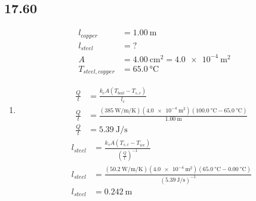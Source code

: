 \documentclass{article}
\begin{document}
\subsection{17.60}

\begin{align*}
	l_{copper} & = \SI{1.00}{\meter} \\
	l_{steel} & = ? \\
	A & = \SI{4.00}{\centi \meter \squared} = \SI{4.0e-4}{\meter \squared} \\
	T_{steel,copper} & = \SI{65.0}{\celsius}
\end{align*}
\begin{enumerate}[label = \boldalph]
	\item
		\begin{align*}
			\frac{ Q }{ t } & = \frac{ k_{c}A(T_{boil} - T_{s,c}) }{ l_{c} } \\
			\frac{ Q }{ t } & = \frac{ (\SI{385}{\watt \per \meter \per \kelvin})(\SI{4.0e-4}{\meter \squared})(\SI{100.0}{\celsius} - \SI{65.0}{\celsius}) }{ \SI{1.00}{\meter} } \\
			\frac{ Q }{ t } & = \SI{5.39}{\joule \per \second}
		\end{align*}
		\begin{align*}
			l_{steel} & = \frac{ k_{s}A(T_{s,c} - T_{ice}) }{ \left( \frac{ Q }{ t } \right)^{-1} } \\
			l_{steel} & = \frac{ (\SI{50.2}{\watt \per \meter \per \kelvin})(\SI{4.0e-4}{\meter \squared})(\SI{65.0}{\celsius} - \SI{0.00}{\celsius}) }{ \left( \SI{5.39}{\joule \per \second} \right)^{-1} } \\
			l_{steel} & = \SI{0.242}{\meter}
		\end{align*}
\end{enumerate}
\end{document}
